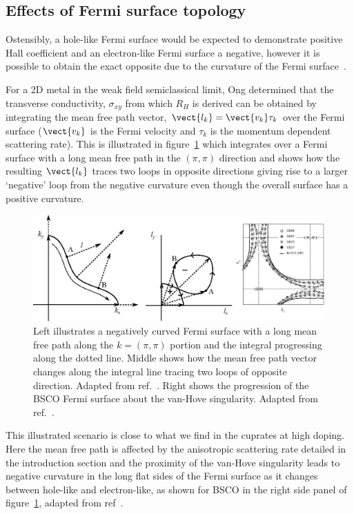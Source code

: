 \subsection{Effects of Fermi surface topology}
    \label{Sec:Theo:TopologyEffects}

Ostensibly, a hole-like Fermi surface would be expected to demonstrate positive Hall coefficient and an electron-like Fermi surface a negative, however it is possible to obtain the exact opposite due to the curvature of the Fermi surface~\cite{Narduzzo2008}. 

For a 2D metal in the weak field semiclassical limit, Ong determined that the transverse conductivity, $\sigma_{xy}$ from which $R_H$ is derived can be obtained by integrating the mean free path vector, $\vect{l_k} = \vect{v_k}\tau_k$ over the Fermi surface ($\vect{v_k}$ is the Fermi velocity and $\tau_k$ is the momentum dependent scattering rate). This is illustrated in figure~\ref{Fig:Theo:NegativeCurvatureLSCO} which integrates over a Fermi surface with a long mean free path in the $(\pi, \pi)$ direction and shows how the resulting $\vect{l_k}$ traces two loops in opposite directions giving rise to a larger `negative' loop from the negative curvature even though the overall surface has a positive curvature.
\begin{figure}[htbp]
    \begin{center}
        \includegraphics[scale=0.9]{Chapter-Theory/Figures/NegativeCurvatureLSCO/NegativeCurvatureLSCO}
        \caption{Left illustrates a negatively curved Fermi surface with a long mean free path along the $k = (\pi, \pi)$ portion and the integral progressing along the dotted line. Middle shows how the mean free path vector changes along the integral line tracing two loops of opposite direction. Adapted from ref.~\cite{Narduzzo2008}. Right shows the progression of the \ac{BSCO} Fermi surface about the van-Hove singularity. Adapted from ref.~\cite{Kondo2004}.}
        \label{Fig:Theo:NegativeCurvatureLSCO}
    \end{center}
\end{figure}
This illustrated scenario is close to what we find in the cuprates at high doping. Here the mean free path is affected by the anisotropic scattering rate detailed in the introduction section and the proximity of the van-Hove singularity leads to negative curvature in the long flat sides of the Fermi surface as it changes between hole-like and electron-like, as shown for \ac{BSCO} in the right side panel of figure~\ref{Fig:Theo:NegativeCurvatureLSCO}, adapted from ref~\cite{Kondo2004}.
